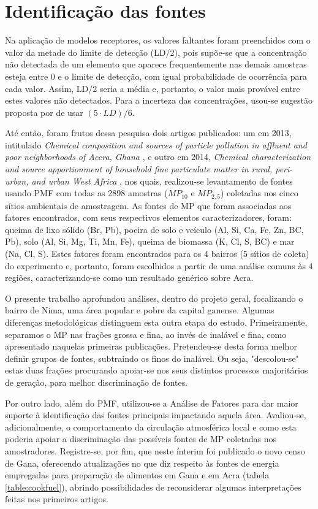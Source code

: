 \newpage
\section{Identificação das fontes}

Na aplicação de modelos receptores, os valores faltantes foram preenchidos com 
o valor da metade do limite de detecção (LD/2), pois supõe-se que a concentração
não detectada de um elemento que aparece frequentemente nas demais amostras 
esteja entre 0 e o limite de detecção, com igual probabilidade de ocorrência 
para cada valor. Assim, LD/2 seria a média e, portanto, o valor mais 
provável entre estes valores não detectados. Para a incerteza das concentrações,
usou-se sugestão proposta por \citet{polissar1998} de usar $(5 \cdot LD)/6$.

Até então, foram frutos dessa pesquisa dois artigos publicados: um em 2013, 
intitulado \textit{Chemical composition and sources of particle pollution in 
affluent and poor neighborhoods of Accra, Ghana} \citep{zhou2013}, e outro em 
2014, \textit{Chemical characterization and source apportionment of household 
fine particulate matter in rural, peri-urban, and urban West Africa} 
\citep{zhou2014}, nos quais, realizou-se levantamento de fontes usando PMF com 
todas as 2898 amostras ($MP_{10}$ e $MP_{2,5}$) coletadas nos cinco sítios 
ambientais de amostragem. As fontes de MP que foram associadas aos fatores 
encontrados, com seus respectivos elementos caracterizadores, foram: 
queima de lixo sólido (Br, Pb), poeira de solo e veículo (Al, Si, Ca, Fe, Zn, 
BC, Pb), solo (Al, Si, Mg, Ti, Mn, Fe), queima de biomassa (K, Cl, S, BC) e mar 
(Na, Cl, S). Estes fatores foram encontrados para os 4 bairros (5 sítios de 
coleta) do experimento e, portanto, foram escolhidos a partir de uma análise
comuns às 4 regiões, caracterizando-se como um resultado genérico sobre Acra.

O presente trabalho aprofundou análises, dentro do projeto geral, focalizando o 
bairro de Nima, uma área popular e pobre da capital ganense. Algumas diferenças 
metodológicas distinguem esta outra etapa do estudo. Primeiramente, separamos o 
MP nas frações grossa e fina, ao invés de inalável e fina, como apresentado 
naquelas primeiras publicações. Pretendeu-se desta forma melhor definir grupos 
de fontes, subtraindo os finos do inalável. Ou seja, "descolou-se" estas duas 
frações procurando apoiar-se nos seus distintos processos majoritários de 
geração, para melhor discriminação de fontes.

Por outro lado, além do PMF, utilizou-se a Análise de Fatores para dar maior 
suporte à identificação das fontes principais impactando aquela área. 
Avaliou-se, adicionalmente, o comportamento da circulação atmosférica local e 
como esta poderia apoiar a discriminação das possíveis fontes de MP coletadas 
nos amostradores. Registre-se, por fim, que neste ínterim foi publicado o novo 
censo de Gana, oferecendo atualizações no que diz respeito às fontes de energia
empregadas para preparação de alimentos em Gana e em Acra (tabela 
\ref{table:cookfuel}), abrindo possibilidades de reconsiderar algumas 
interpretações feitas nos primeiros artigos.

